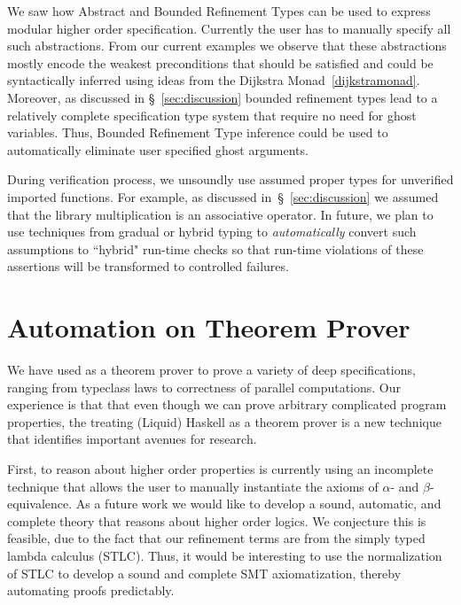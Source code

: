 \label{future:ghost}
We saw how Abstract and Bounded Refinement Types can be used to express 
modular higher order specification. 
%
Currently the user has to manually specify all such abstractions. 
From our current examples we observe that these abstractions mostly encode 
the weakest preconditions that should be satisfied and could be syntactically 
inferred using ideas from the Dijkstra Monad~\ref{dijkstramonad}. 
%
Moreover, as discussed in \S~\ref{sec:discussion}
bounded refinement types lead to a relatively complete 
specification type system that require no need for ghost variables. 
Thus, Bounded Refinement Type inference could be used to automatically eliminate 
user specified ghost arguments. 



During verification process, we unsoundly use assumed 
proper types for unverified imported functions.
For example, as discussed in~\S~\ref{sec:discussion}
we assumed that the library multiplication is an associative operator. 
In future, we plan to use techniques from gradual or hybrid typing 
to \textit{automatically} convert such assumptions to ``hybrid" run-time checks
so that run-time violations of these assertions will be transformed to 
controlled failures.


\section{Automation on Theorem Prover}
\label{future:theoremproving}

We have used \toolname as a theorem prover 
to prove a variety of deep specifications, 
ranging from typeclass laws to correctness of parallel computations. 
%
Our experience is that that even though we can prove arbitrary complicated 
program properties, the treating (Liquid) Haskell as a theorem prover 
is a new technique that identifies
important avenues for research.

First, to reason about higher order properties 
\toolname is currently using an incomplete technique 
that allows the user to manually instantiate the 
axioms of $\alpha$- and $\beta$-equivalence.
%
As a future work we would like to develop a 
sound, automatic, and complete theory that reasons about 
higher order logics. 
We conjecture this is feasible,
due to the fact that our refinement terms
are from the simply typed lambda calculus (STLC).
%
Thus, it would be interesting to use the
normalization of STLC to develop a sound
and complete SMT axiomatization, thereby
automating proofs predictably.

